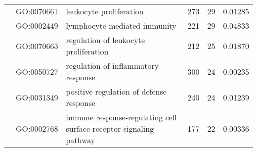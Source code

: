 \begin{landscape}
\begin{longtable}[c]{@{}lllccr@{}}
		                                               & GO:0070661                         & leukocyte proliferation                                                   & 273                                                                & 29                                                                   & 0.01285                                                                                  \\
		                                               & GO:0002449                         & lymphocyte mediated immunity                                              & 221                                                                & 29                                                                   & 0.04833                                                                                  \\
		                                               & GO:0070663                         & regulation of leukocyte proliferation                                     & 212                                                                & 25                                                                   & 0.01870                                                                                  \\
		                                               & GO:0050727                         & regulation of inflammatory response                                       & 300                                                                & 24                                                                   & 0.00235                                                                                  \\
		                                               & GO:0031349                         & positive regulation of defense response                                   & 240                                                                & 24                                                                   & 0.01239                                                                                  \\
		                                               & GO:0002768                         & immune response-regulating cell surface receptor signaling pathway        & 177                                                                & 22                                                                   & 0.00336                                                                                  \\

\end{longtable}
\end{landscape}
